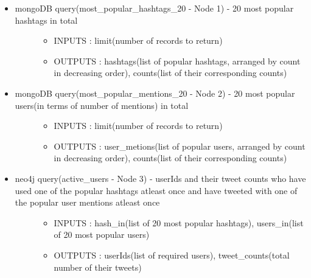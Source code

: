 \documentclass[letterpaper,10pt,english]{sphinxmanual}
\begin{document}
\begin{itemize}
\item {} \begin{description}
\item[{mongoDB query(most\_popular\_hashtags\_20 - Node 1) - 20 most popular hashtags in total}] \leavevmode\begin{itemize}
\item {} 
INPUTS  : limit(number of records to return)

\item {} 
OUTPUTS : hashtags(list of popular hashtags, arranged by count in decreasing order), counts(list of their corresponding counts)

\end{itemize}

\end{description}

\item {} \begin{description}
\item[{mongoDB query(most\_popular\_mentions\_20 - Node 2) - 20 most popular users(in terms of number of mentions) in total}] \leavevmode\begin{itemize}
\item {} 
INPUTS  : limit(number of records to return)

\item {} 
OUTPUTS : user\_metions(list of popular users, arranged by count in decreasing order), counts(list of their corresponding counts)

\end{itemize}

\end{description}

\item {} \begin{description}
\item[{neo4j query(active\_users - Node 3)   - userIds and their tweet counts who have used one of the popular hashtags atleast once and have tweeted with one of the popular user mentions atleast once}] \leavevmode\begin{itemize}
\item {} 
INPUTS  : hash\_in(list of 20 most popular hashtags), users\_in(list of 20 most popular users)

\item {} 
OUTPUTS : userIds(list of required users), tweet\_counts(total number of their tweets)

\end{itemize}

\end{description}

\end{itemize}
\end{document}
